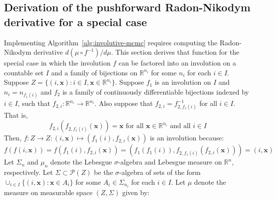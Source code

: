 \documentclass[twoside]{article}
\begin{document}
\subsection{Derivation of the pushforward Radon-Nikodym derivative for a special case} \label{sec:radon-nikodym-special-case}
Implementing Algorithm~\ref{alg:involutive-mcmc} requires computing the Radon-Nikodym derivative $d (\mu \circ f^{-1}) / d \mu$.
This section derives that function for the special case in which the involution $f$ can be factored into an involution on a countable set $I$ and a family of bijections on $\mathbb{R}^{n_i}$ for some $n_i$ for each $i \in I$.
Suppose $Z = \{(i, \mathbf{x}) : i \in I, \mathbf{x} \in \mathbb{R}^{n_i}\}$.
Suppose $f_1$ is an involution on $I$ and $n_i = n_{f_1(i)}$ and $f_2$ is a family of continuously differentiable bijections indexed by $i \in I$, such that $f_{2,i} : \mathbb{R}^{n_i} \to \mathbb{R}^{n_i}$.
Also suppose that $f_{2,i} = f_{2,f_1(i)}^{-1}$ for all $i \in I$. That is,
\begin{equation}
f_{2,i}(f_{2,f_1(i)}(\mathbf{x})) = \mathbf{x} \mbox{ for all } \mathbf{x} \in \mathbb{R}^{n_i} \mbox{ and all } i \in I
\end{equation} 
Then, $f : Z \to Z : (i, \mathbf{x}) \mapsto (f_1(i), f_{2,i}(\mathbf{x}))$ is an involution because:
\begin{equation}
f(f(i, \mathbf{x})) = f(f_1(i), f_{2,i}(\mathbf{x})) = (f_1(f_1(i)), f_{2,f_1(i)}(f_{2,i}(\mathbf{x}))) = (i, \mathbf{x})
\end{equation}
Let $\Sigma_n$ and $\mu_n$ denote the Lebesgue $\sigma$-algebra and Lebesgue measure on $\mathbb{R}^n$, respectively.
Let $\Sigma \subset \mathcal{P}(Z)$ be the $\sigma$-algebra of sets of the form $\cup_{i \in I} \{(i, \mathbf{x}) : \mathbf{x} \in A_i\}$ for some $A_i \in \Sigma_{n_i}$ for each $i \in I$.
Let $\mu$ denote the measure on measurable space $(Z, \Sigma)$ given by:%
\end{document}
